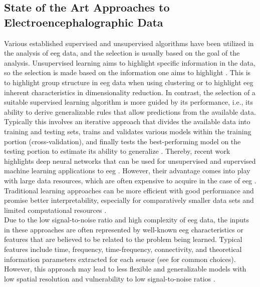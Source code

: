 \subsection{State of the Art Approaches to Electroencephalographic Data}
\label{theory:ml:applications_eeg}
Various established supervised and unsupervised algorithms have been utilized in the analysis of \gls{eeg} data, and the selection is usually based on the goal of the analysis. Unsupervised learning aims to highlight specific information in the data, so the selection is made based on the information one aims to highlight \cite{Shalev2014}. This is to highlight group structure in \gls{eeg} data when using clustering or to highlight \gls{eeg} inherent characteristics in dimensionality reduction. In contrast, the selection of a suitable supervised learning algorithm is more guided by its performance, i.e., its ability to derive generalizable rules that allow predictions from the available data. Typically this involves an iterative approach that divides the available data into training and testing sets, trains and validates various models within the training portion (cross-validation), and finally tests the best-performing model on the testing portion to estimate its ability to generalize \cite{Hastie2009}. Thereby, recent work highlights deep neural networks that can be used for unsupervised and supervised machine learning applications to \gls{eeg} \cite{Roy2019}. However, their advantage comes into play with large data resources, which are often expensive to acquire in the case of \gls{eeg} \cite{Banville2021}. Traditional learning approaches can be more efficient with good performance and promise better interpretability, especially for comparatively smaller data sets and limited computational resources \cite{Gemein2020}.\\
Due to the low signal-to-noise ratio and high complexity of \gls{eeg} data, the inputs in these approaches are often represented by well-known \gls{eeg} characteristics or features that are believed to be related to the problem being learned. Typical features include time, frequency, time-frequency, connectivity, and theoretical information parameters extracted for each sensor (see \cite{Gemein2020} for common choices). However, this approach may lead to less flexible and generalizable models with low spatial resolution and vulnerability to low signal-to-noise ratios \cite{Saeidi2021}.\\
